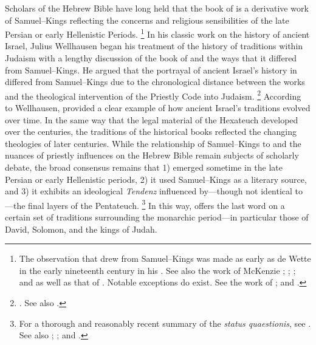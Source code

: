 Scholars of the Hebrew Bible have long held that the book of \chronicles is a derivative work of Samuel--Kings reflecting the concerns and religious sensibilities of the late Persian or early Hellenistic Periods.%
    \footnote{The observation that \chronicles drew from Samuel--Kings was made as early as de Wette in the early nineteenth century in his \cite*{dewette1806}. See also the work of McKenzie
        \cite*{mckenzie1985};
        \cite{mckenzie_graham-mckenzie1999};
        \cite[66--71]{knoppers2003}; and
        \cite[30--42]{klein2006} as well as that of
        \cite[74--74]{carr2011}. Notable exceptions do exist. See the work of
        \cite{auld1994};
        \cite{auld_graham-mckenzie1999} and
        \cite{person2010}.}
In his classic work on the history of ancient Israel, Julius Wellhausen began his treatment of the history of traditions within Judaism with a lengthy discussion of the book of \chronicles and the ways that it differed from Samuel--Kings. He argued that the portrayal of ancient Israel's history in \chronicles differed from Samuel--Kings due to the chronological distance between the works and the theological intervention of the Priestly Code into \secondtemple Judaism.%
    \footnote{%
        \cite[171--172]{wellhausen1957}. See also
        \cite{wright_ulrich-wright1992}.}
According to Wellhausen, \chronicles provided a clear example of how ancient Israel's traditions evolved over time. In the same way that the legal material of the Hexateuch developed over the centuries, the traditions of the historical books reflected the changing theologies of later centuries. While the relationship of Samuel--Kings to \chronicles and the nuances of priestly influences on the Hebrew Bible remain subjects of scholarly debate, the broad consensus remains that 1) \chronicles emerged sometime in the late Persian or early Hellenistic periods, 2) it used Samuel--Kings as a literary source, and 3) it exhibits an ideological \emph{Tendenz} influenced by---though not identical to---the final layers of the Pentateuch.%
    \footnote{For a thorough and reasonably recent summary of the \emph{status quaestionis}, see
        \cite[72--89]{knoppers2003}. See also
        \cite{japhet1993};
        \cite{japhet2009};
        \cite{braun1986} and
        \cite{coggins1976}.}
In this way, \chronicles offers the last word on a certain set of traditions surrounding the monarchic period---in particular those of David, Solomon, and the kings of Judah.

